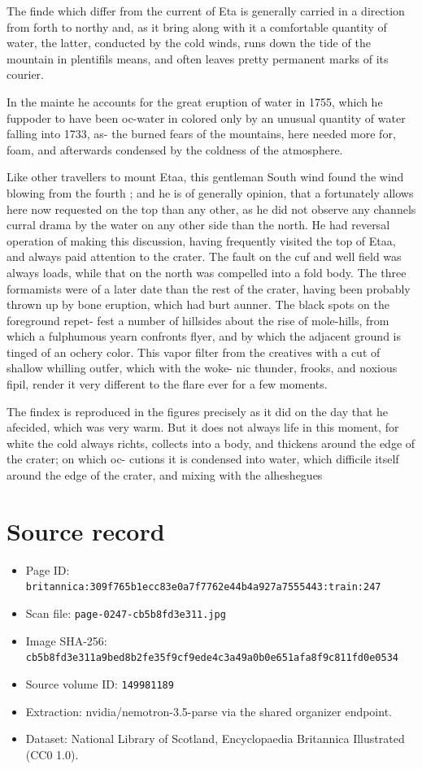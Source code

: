 \documentclass{article}
\begin{document}
The finde which differ from the current of Eta is generally carried in a direction from forth to northy and, as it bring along with it a comfortable quantity of water, the latter, conducted by the cold winds, runs down the tide of the mountain in plentifils means, and often leaves pretty permanent marks of its courier.

In the mainte he accounts for the great eruption of water in 1755, which he fuppoder to have been oc-water in colored only by an unusual quantity of water falling into 1733, as- the burned fears of the mountains, here needed more for, foam, and afterwards condensed by the coldness of the atmosphere.

Like other travellers to mount Etaa, this gentleman South wind found the wind blowing from the fourth ; and he is of generally opinion, that a fortunately allows here now requested on the top than any other, as he did not observe any channels curral drama by the water on any other side than the north. He had reversal operation of making this discussion, having frequently visited the top of Etaa, and always paid attention to the crater. The fault on the cuf and well field was always loads, while that on the north was compelled into a fold body. The three formamists were of a later date than the rest of the crater, having been probably thrown up by bone eruption, which had burt aunner. The black spots on the foreground repet- fest a number of hillsides about the rise of mole-hills, from which a fulphumous yearn confronts flyer, and by which the adjacent ground is tinged of an ochery color. This vapor filter from the creatives with a cut of shallow whilling outfer, which with the woke- nic thunder, frooks, and noxious fipil, render it very different to the flare ever for a few moments.

The findex is reproduced in the figures precisely as it did on the day that he afecided, which was very warm. But it does not always life in this moment, for white the cold always richts, collects into a body, and thickens around the edge of the crater; on which oc- cutions it is condensed into water, which difficile itself around the edge of the crater, and mixing with the alheshegues

\section*{Source record}
\begin{itemize}
\item Page ID: \texttt{britannica:309f765b1ecc83e0a7f7762e44b4a927a7555443:train:247}
\item Scan file: \texttt{page-0247-cb5b8fd3e311.jpg}
\item Image SHA-256: \texttt{cb5b8fd3e311a9bed8b2fe35f9cf9ede4c3a49a0b0e651afa8f9c811fd0e0534}
\item Source volume ID: \texttt{149981189}
\item Extraction: nvidia/nemotron-3.5-parse via the shared organizer endpoint.
\item Dataset: National Library of Scotland, Encyclopaedia Britannica Illustrated (CC0 1.0).
\end{itemize}
\end{document}
